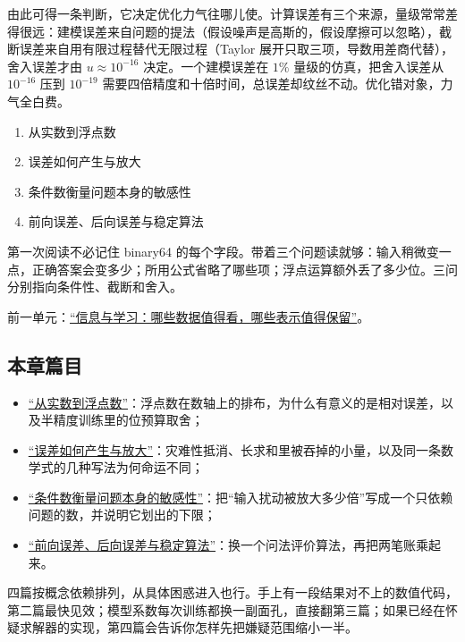 由此可得一条判断，它决定优化力气往哪儿使。计算误差有三个来源，量级常常差得很远：建模误差来自问题的提法（假设噪声是高斯的，假设摩擦可以忽略），截断误差来自用有限过程替代无限过程（Taylor 展开只取三项，导数用差商代替），舍入误差才由 \(u\approx10^{-16}\) 决定。一个建模误差在 \(1\%\) 量级的仿真，把舍入误差从 \(10^{-16}\) 压到 \(10^{-19}\) 需要四倍精度和十倍时间，总误差却纹丝不动。优化错对象，力气全白费。

\begin{enumerate}
\tightlist
\item
  从实数到浮点数
\item
  误差如何产生与放大
\item
  条件数衡量问题本身的敏感性
\item
  前向误差、后向误差与稳定算法
\end{enumerate}

第一次阅读不必记住 binary64 的每个字段。带着三个问题读就够：输入稍微变一点，正确答案会变多少；所用公式省略了哪些项；浮点运算额外丢了多少位。三问分别指向条件性、截断和舍入。

前一单元：\hyperref[ch:059]{``信息与学习：哪些数据值得看，哪些表示值得保留''}。

\subsection{本章篇目}

\begin{itemize}
\tightlist
\item \hyperref[sec:08-Numerical-Analysis/01-Floating-Point-and-Error/01]{``从实数到浮点数''}：浮点数在数轴上的排布，为什么有意义的是相对误差，以及半精度训练里的位预算取舍；
\item \hyperref[sec:08-Numerical-Analysis/01-Floating-Point-and-Error/02]{``误差如何产生与放大''}：灾难性抵消、长求和里被吞掉的小量，以及同一条数学式的几种写法为何命运不同；
\item \hyperref[sec:08-Numerical-Analysis/01-Floating-Point-and-Error/03]{``条件数衡量问题本身的敏感性''}：把``输入扰动被放大多少倍''写成一个只依赖问题的数，并说明它划出的下限；
\item \hyperref[sec:08-Numerical-Analysis/01-Floating-Point-and-Error/04]{``前向误差、后向误差与稳定算法''}：换一个问法评价算法，再把两笔账乘起来。
\end{itemize}

四篇按概念依赖排列，从具体困惑进入也行。手上有一段结果对不上的数值代码，第二篇最快见效；模型系数每次训练都换一副面孔，直接翻第三篇；如果已经在怀疑求解器的实现，第四篇会告诉你怎样先把嫌疑范围缩小一半。
